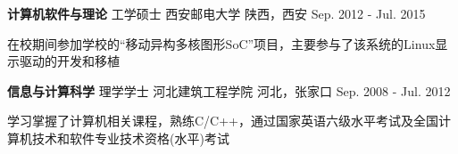 
\begin{cventries}
  \cventry
    {\textbf{计算机软件与理论} \hspace{0.2cm} 工学硕士} %
    {西安邮电大学} %
    {陕西，西安} %
    {Sep. 2012 - Jul. 2015} %
    {
      \begin{cvitems} %
         \item {在校期间参加学校的“移动异构多核图形SoC”项目，主要参与了该系统的Linux显示驱动的开发和移植}
      \end{cvitems}
    }

  \cventry
    {\textbf{信息与计算科学} \hspace{0.2cm} 理学学士} %
    {河北建筑工程学院} %
    {河北，张家口} %
    {Sep. 2008 - Jul. 2012} %
    {
      \begin{cvitems} %
      \item {学习掌握了计算机相关课程，熟练C/C++，通过国家英语六级水平考试及全国计算机技术和软件专业技术资格(水平)考试}
      \end{cvitems}
    }
\end{cventries}
